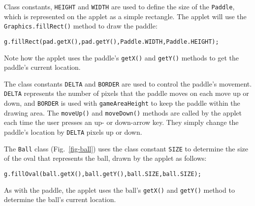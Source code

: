 Class constants, {\tt HEIGHT} and {\tt WIDTH} are used to
define the size of the {\tt Paddle}, which is represented on
the applet as a simple rectangle. The applet will use the
{\tt Graphics.fillRect()} method  to draw the paddle:

\begin{jjjlisting}[28pc]
\begin{lstlisting}
g.fillRect(pad.getX(),pad.getY(),Paddle.WIDTH,Paddle.HEIGHT);
\end{lstlisting}
\end{jjjlisting}

\noindent Note how the applet uses the paddle's {\tt getX()}
and {\tt getY()} methods to get the paddle's current location. 


The class constants {\tt DELTA} and {\tt BORDER} are used to control
the paddle's movement. {\tt DELTA} represents the number of pixels
that the paddle moves on each move up or down, and {\tt BORDER} is
used with {\tt gameAreaHeight} to keep the paddle within the
drawing area.  The {\tt moveUp()} and {\tt moveDown()} methods are
called by the applet each time the user presses an up- or down-arrow key.
They simply change the paddle's location by {\tt DELTA} pixels up or
down.

\pagebreak
The {\tt Ball} class (Fig.~\ref{fig-ball}) uses the class constant
{\tt SIZE} to determine the size of the oval that represents the ball,
drawn by the applet as follows:

\begin{jjjlisting}
\begin{lstlisting}
g.fillOval(ball.getX(),ball.getY(),ball.SIZE,ball.SIZE);
\end{lstlisting}
\end{jjjlisting}

\noindent As with the paddle, the applet uses the
ball's {\tt getX()} and {\tt getY()} method to determine the ball's
current location.

